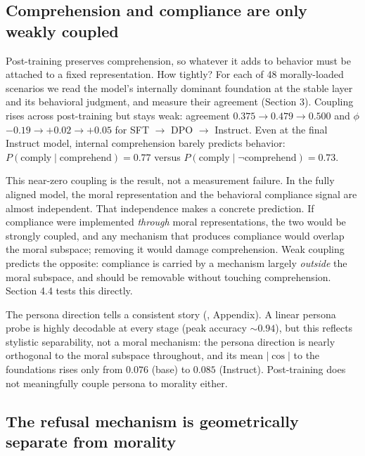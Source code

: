 \subsection{Comprehension and compliance are only weakly coupled}\label{comprehension-and-compliance-are-only-weakly-coupled}

Post-training preserves comprehension, so whatever it adds to behavior must be
attached to a fixed representation. How tightly? For each of 48 morally-loaded
scenarios we read the model's internally dominant foundation at the stable layer
and its behavioral judgment, and measure their agreement (Section 3). Coupling
rises across post-training but stays weak: agreement \(0.375 \to 0.479 \to 0.500\)
and \(\phi\) \(-0.19 \to +0.02 \to +0.05\) for SFT \(\to\) DPO \(\to\) Instruct. Even at
the final Instruct model, internal comprehension barely predicts behavior:
\(P(\text{comply} \mid \text{comprehend}) = 0.77\) versus
\(P(\text{comply} \mid \neg\text{comprehend}) = 0.73\).

This near-zero coupling is the result, not a measurement failure. In the fully
aligned model, the moral representation and the behavioral compliance signal are
almost independent. That independence makes a concrete prediction. If compliance
were implemented \emph{through} moral representations, the two would be strongly
coupled, and any mechanism that produces compliance would overlap the moral
subspace; removing it would damage comprehension. Weak coupling predicts the
opposite: compliance is carried by a mechanism largely \emph{outside} the moral
subspace, and should be removable without touching comprehension. Section 4.4
tests this directly.

The persona direction tells a consistent story (, Appendix).
A linear persona probe is highly decodable at every stage (peak accuracy
\({\sim}0.94\)), but this reflects stylistic separability, not a moral mechanism:
the persona direction is nearly orthogonal to the moral subspace throughout, and
its mean \(|\cos|\) to the foundations rises only from \(0.076\) (base) to \(0.085\)
(Instruct). Post-training does not meaningfully couple persona to morality
either.

\subsection{The refusal mechanism is geometrically separate from morality}\label{the-refusal-mechanism-is-geometrically-separate-from-morality}

